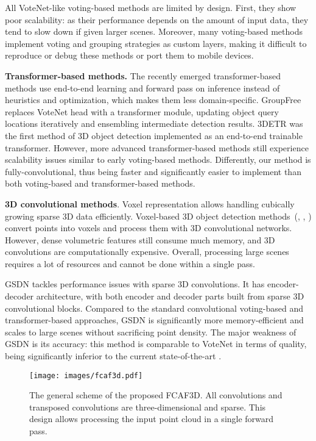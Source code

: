 \documentclass[runningheads]{llncs}
\begin{document}
All VoteNet-like voting-based methods are limited by design. First, they show poor scalability: as their performance depends on the amount of input data, they tend to slow down if given larger scenes. Moreover, many voting-based methods implement voting and grouping strategies as custom layers, making it difficult to reproduce or debug these methods or port them to mobile devices. %

\textbf{Transformer-based methods.} The recently emerged transformer-based methods use end-to-end learning and forward pass on inference instead of heuristics and optimization, which makes them less domain-specific. GroupFree \cite{liu2021group-free} replaces VoteNet head with a transformer module, updating object query locations iteratively and ensembling intermediate detection results. 3DETR \cite{misra20213detr} was the first method of 3D object detection implemented as an end-to-end trainable transformer. However, more advanced transformer-based methods still experience scalability issues similar to early voting-based methods. Differently, our method is fully-convolutional, thus being faster and significantly easier to implement than both voting-based and transformer-based methods.

\textbf{3D convolutional methods}. Voxel representation allows handling cubically growing sparse 3D data efficiently. Voxel-based 3D object detection methods~(\cite{hou20193dsis}, \cite{maturana2015voxnet}, \cite{shen2020frustum}) convert points into voxels and process them with 3D convolutional networks. However, dense volumetric features still consume much memory, and 3D convolutions are computationally expensive. Overall, processing large scenes requires a lot of resources and cannot be done within a single pass.

GSDN \cite{gwak2020gsdn} tackles performance issues with sparse 3D convolutions. It has encoder-decoder architecture, with both encoder and decoder parts built from sparse 3D convolutional blocks. Compared to the standard convolutional voting-based and transformer-based approaches, GSDN is significantly more memory-efficient and scales to large scenes without sacrificing point density. The major weakness of GSDN is its accuracy: this method is comparable to VoteNet in terms of quality, being significantly inferior to the current state-of-the-art \cite{liu2021group-free}.

\begin{figure*}[ht!]
    \centering
        \texttt{[image: images/fcaf3d.pdf]}
    \caption{The general scheme of the proposed FCAF3D. All convolutions and transposed convolutions are three-dimensional and sparse. This design allows processing the input point cloud in a single forward pass.}
    \label{fig:fcaf3d}
\end{figure*}
\end{document}
